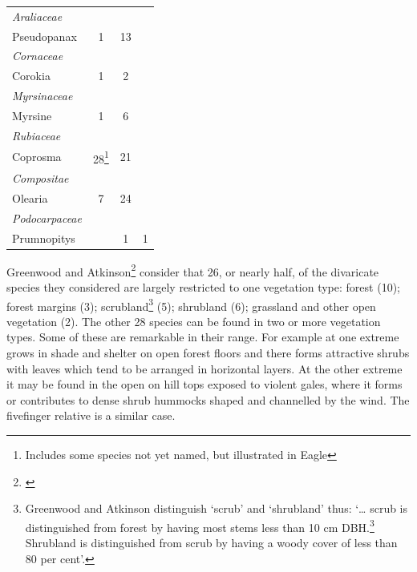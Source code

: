 \begin{xltabular}{\textwidth}{ X c c c }
	\emph{Araliaceae} \\
	\hspace{3mm}Pseudopanax & 1 & 13 \\
	\emph{Cornaceae} \\
	\hspace{3mm}Corokia & 1 & 2 \\
	\emph{Myrsinaceae} \\
	\hspace{3mm}Myrsine & 1 & 6 \\
	\emph{Rubiaceae} \\
	\hspace{3mm}Coprosma
	& 28\footnote{Includes some species not yet named, but illustrated in Eagle}
	& 21 \\
	\emph{Compositae} \\
	\hspace{3mm}Olearia & 7 & 24 \\
	\emph{Podocarpaceae} \\
	\hspace{3mm}Prumnopitys &  & 1 & 1 \\
	\bottomrule
\end{xltabular}

Greenwood and Atkinson\footnote{\cite{greenwood1977evolution}} consider that 26, or nearly half, of the divaricate species they considered are largely restricted to one vegetation type: forest (10); forest margins (3); scrubland\footnote{Greenwood and Atkinson distinguish `scrub' and `shrubland' thus: `… scrub is distinguished from forest by having most stems less than 10 cm DBH.\footnote{DBH:\@Diameter at breast height, typically 1.3m above ground.} Shrubland is distinguished from scrub by having a woody cover of less than 80 per cent'.} (5); shrubland (6); grassland and other open vegetation (2).
The other 28 species can be found in two or more vegetation types.
Some of these are remarkable in their range.
For example  at one extreme grows in shade and shelter on open forest floors and there forms attractive shrubs with leaves which tend to be arranged in horizontal layers.
At the other extreme it may be found in the open on hill tops exposed to violent gales, where it forms or contributes to dense shrub hummocks shaped and channelled by the wind.
The fivefinger relative  is a similar case.


